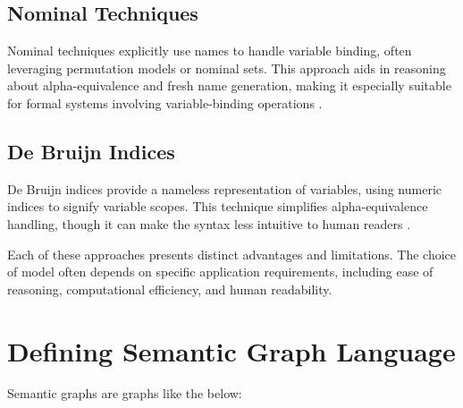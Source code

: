 \documentclass{article}
\begin{document}
\subsection{Nominal Techniques}
Nominal techniques explicitly use names to handle variable binding, often
leveraging permutation models or nominal sets. This approach aids in reasoning
about alpha-equivalence and fresh name generation, making it especially suitable
for formal systems involving variable-binding operations \cite{pitts16nominal}.

\subsection{De Bruijn Indices}
De Bruijn indices provide a nameless representation of variables, using numeric
indices to signify variable scopes. This technique simplifies alpha-equivalence
handling, though it can make the syntax less intuitive to human readers
\cite{bruijn72lambda}.

Each of these approaches presents distinct advantages and limitations. The
choice of model often depends on specific application requirements, including
ease of reasoning, computational efficiency, and human readability.

\section{Defining Semantic Graph Language}
Semantic graphs are graphs like the below:


{}

\end{document}
